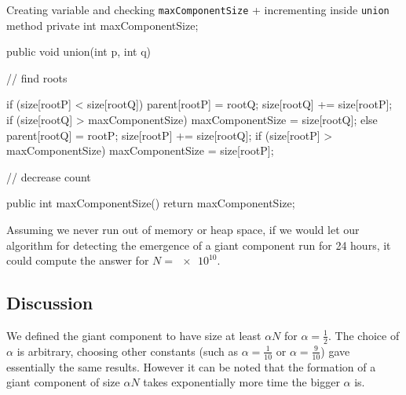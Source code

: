 \documentclass{tufte-handout}
\begin{document}
\begin{sexylisting}{Creating variable and checking {\tt maxComponentSize} + incrementing inside {\tt union} method}
private int maxComponentSize;

public void union(int p, int q) {
    // find roots
    
    if (size[rootP] < size[rootQ]) {
        parent[rootP] = rootQ;
        size[rootQ] += size[rootP];
        if (size[rootQ] > maxComponentSize) maxComponentSize = size[rootQ];
    } else {
        parent[rootQ] = rootP;
        size[rootP] += size[rootQ];
        if (size[rootP] > maxComponentSize) maxComponentSize = size[rootP]; }
    
    // decrease count }
    
public int maxComponentSize() {
    return maxComponentSize; }
\end{sexylisting}

Assuming we never run out of memory or heap space, if we would let our algorithm for detecting the emergence of a giant component run for 24 hours, it could compute the answer for $N= \num{e10}$.



\subsection{Discussion}

We defined the giant component to have size at least $\alpha N$ for $\alpha = \frac{1}{2}$. 
The choice of $\alpha$ is arbitrary, choosing other constants (such as $\alpha=\frac{1}{10}$ or $\alpha=\frac{9}{10}$) gave essentially the same results.
However it can be noted that the formation of a giant component of size $\alpha N$ takes exponentially more time the bigger $\alpha$ is.
\end{document}
